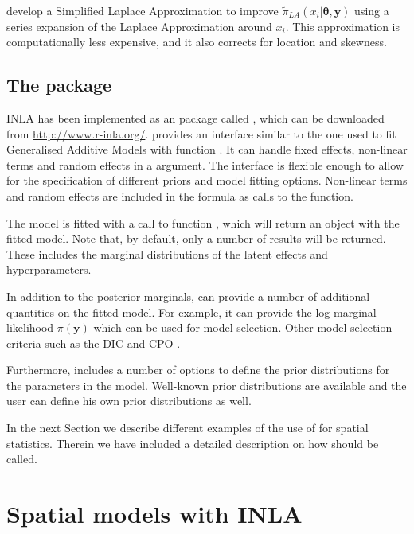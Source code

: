 \documentclass[article]{jss}
\begin{document}
\citet{isi:000264374200002} develop a Simplified Laplace Approximation to
improve $\tilde\pi_{LA}(x_i|\mathbf{\theta}, \mathbf{y})$ using a series
expansion of the Laplace Approximation around $x_i$. This approximation is
computationally less expensive, and it also corrects for location and
skewness.


\subsection[The R-INLA package]{The  package}

INLA has been implemented as an  package called ,
which can be downloaded from \url{http://www.r-inla.org/}. 
provides an interface similar to the one used to fit Generalised Additive
Models with function . It can handle fixed effects, non-linear terms
and random effects in a  argument. The interface is flexible
enough to allow for the specification of different priors and model fitting
options. Non-linear terms and random effects are included in the formula as
calls to the  function. 


The model is fitted with a call to function , which will return an
 object with the fitted model. Note that, by default, only a number
of results will be returned. These includes the marginal distributions of
the latent effects and hyperparameters. 


In addition to the posterior marginals,  can provide a number
of additional quantities on the fitted model. For example, it can 
provide the log-marginal likelihood $\pi(\mathbf{y})$ which can be used
for model selection. Other model selection criteria such as the DIC 
\citep{Spiegelhalteretal:2002} and CPO \citep{Heldetal:2010}.

Furthermore,  includes a number of options to define the
prior distributions for the parameters in the model. Well-known
prior distributions are available and the user can define his own prior
distributions as well.

In the next Section we describe different examples of the use of
 for spatial statistics. Therein we have included
a detailed description on how  should be called.

\section{Spatial models with INLA} \label{sec:spmodels}
\end{document}
